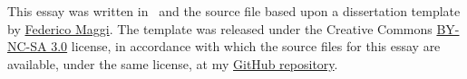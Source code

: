 \begin{acky}
\noindent This essay was written in \XeLaTeX\ and the source file based upon a dissertation template by \href{http://www.latextemplates.com/template/maggi-memoir-thesis}{Federico Maggi}. The template was released under the Creative Commons \href{https://creativecommons.org/licenses/by-nc-sa/3.0/}{BY-NC-SA 3.0} license, in accordance with which the source files for this essay are available, under the same license, at my \href{https://github.com/sjt12/part-c-diss}{GitHub repository}.
\end{acky}